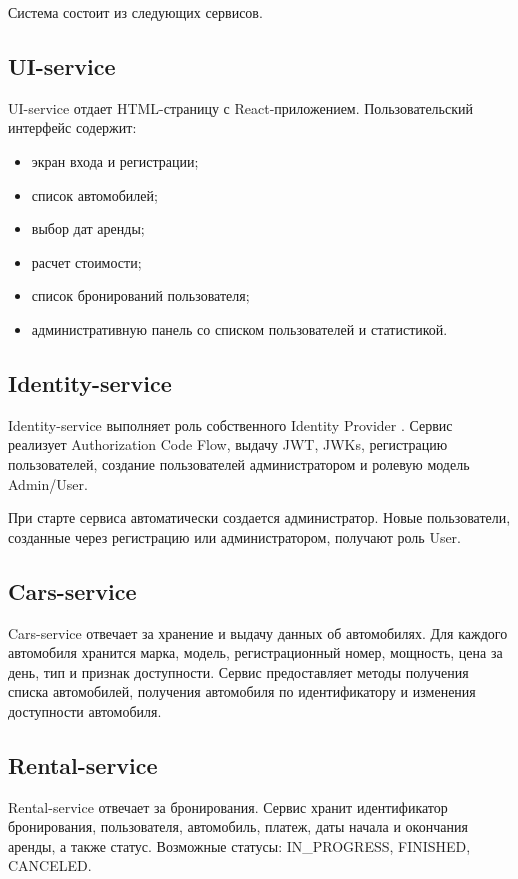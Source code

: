 Система состоит из следующих сервисов.

\subsection{UI-service}

UI-service отдает HTML-страницу с React-приложением. Пользовательский интерфейс содержит:

\begin{itemize}
  \item экран входа и регистрации;
  \item список автомобилей;
  \item выбор дат аренды;
  \item расчет стоимости;
  \item список бронирований пользователя;
  \item административную панель со списком пользователей и статистикой.
\end{itemize}

\subsection{Identity-service}

Identity-service выполняет роль собственного Identity Provider \cite{idprovider}. Сервис реализует Authorization Code Flow, выдачу JWT, JWKs, регистрацию пользователей, создание пользователей администратором и ролевую модель Admin/User.

При старте сервиса автоматически создается администратор. Новые пользователи, созданные через регистрацию или администратором, получают роль User.

\subsection{Cars-service}

Cars-service отвечает за хранение и выдачу данных об автомобилях. Для каждого автомобиля хранится марка, модель, регистрационный номер, мощность, цена за день, тип и признак доступности. Сервис предоставляет методы получения списка автомобилей, получения автомобиля по идентификатору и изменения доступности автомобиля.

\subsection{Rental-service}

Rental-service отвечает за бронирования. Сервис хранит идентификатор бронирования, пользователя, автомобиль, платеж, даты начала и окончания аренды, а также статус. Возможные статусы: IN\_PROGRESS, FINISHED, CANCELED.

